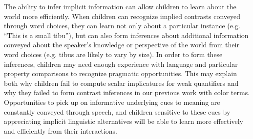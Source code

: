 \documentclass[10pt,letterpaper]{article}
\begin{document}
The ability to infer implicit information can allow children to learn about the world more efficiently.  When children can recognize implied contrasts conveyed through word choices, they can learn not only about a particular instance (e.g. ``This is a small tibu''), but can also form inferences about additional information conveyed about the speaker's knowledge or perspective of the world from their word choices (e.g. tibus are likely to vary by size).  In order to form these inferences, children may need enough experience with language and particular property comparisons to recognize pragmatic opportunities.  This may explain both why children fail to compute scalar implicatures for weak quantifiers and why they failed to form contrast inferences in our previous work with color terms.  Opportunities to pick up on informative underlying cues to meaning are constantly conveyed through speech, and children sensitive to these cues by appreciating implicit linguistic alternatives will be able to learn more effectively and efficiently from their interactions. 


\end{document}
